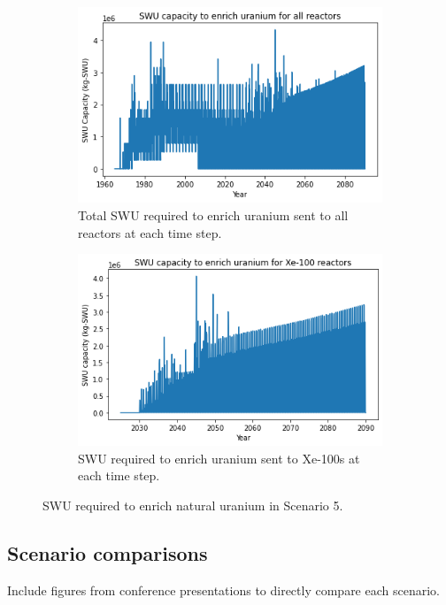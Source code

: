 \begin{figure}
    \centering
    \begin{subfigure}{0.5\textwidth}
        \centering
        \includegraphics[scale=0.5]{../figures/totalswu_scenarios_5.png}
        \caption{Total \gls{SWU} required to enrich uranium sent to all reactors at each time step.}
        \label{fig:totalswu_5}
    \end{subfigure}
    \hspace{0.8cm}
    \begin{subfigure}{0.5\textwidth}
        \centering
        \includegraphics[scale=0.5]{../figures/haleuSWU_scenarios_5.png}
        \caption{\gls{SWU} required to enrich uranium sent to Xe-100s at each time step.}
        \label{fig:haleuswu_5}
    \end{subfigure}
    \caption{\gls{SWU} required to enrich natural uranium in Scenario 5.}
    \label{fig:swu_5}
\end{figure}

\subsection{Scenario comparisons}
Include figures from conference presentations to directly compare each 
scenario. 

